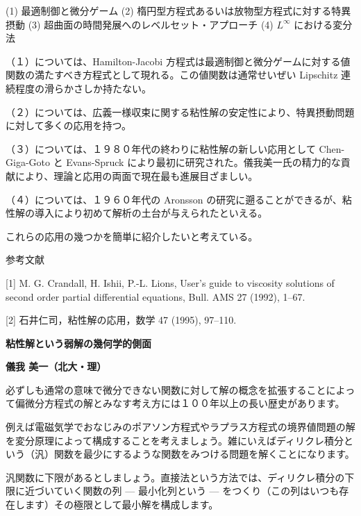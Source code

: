 \documentclass[uplatex,dvipdfmx]{jlreq}
\begin{document}
(1) 最適制御と微分ゲーム  
(2) 楕円型方程式あるいは放物型方程式に対する特異摂動  
(3) 超曲面の時間発展へのレベルセット・アプローチ  
(4) $L^\infty$ における変分法  

（１）については、Hamilton-Jacobi 方程式は最適制御と微分ゲームに対する値関数の満たすべき方程式として現れる。この値関数は通常せいぜい Lipschitz 連続程度の滑らかさしか持たない。

（２）については、広義一様収束に関する粘性解の安定性により、特異摂動問題に対して多くの応用を持つ。

（３）については、１９８０年代の終わりに粘性解の新しい応用として Chen-Giga-Goto と Evans-Spruck により最初に研究された。儀我美一氏の精力的な貢献により、理論と応用の両面で現在最も進展目ざましい。

（４）については、１９６０年代の Aronsson の研究に遡ることができるが、粘性解の導入により初めて解析の土台が与えられたといえる。

これらの応用の幾つかを簡単に紹介したいと考えている。

\bigskip

参考文献

[1] M. G. Crandall, H. Ishii, P.-L. Lions,  
User's guide to viscosity solutions of second order partial differential equations,  
Bull. AMS 27 (1992), 1--67.

[2] 石井仁司，粘性解の応用，数学 47 (1995), 97--110.

\newpage


\begin{center}
{\large\bfseries 粘性解という弱解の幾何学的側面}
\end{center}

\begin{flushright}
\textbf{儀我 美一（北大・理）}
\end{flushright}

必ずしも通常の意味で微分できない関数に対して解の概念を拡張することによって偏微分方程式の解とみなす考え方には１００年以上の長い歴史があります。

例えば電磁気学でおなじみのポアソン方程式やラプラス方程式の境界値問題の解を変分原理によって構成することを考えましょう。雑にいえばディリクレ積分という（汎）関数を最少にするような関数をみつける問題を解くことになります。

汎関数に下限があるとしましょう。直接法という方法では、ディリクレ積分の下限に近づいていく関数の列 --- 最小化列という --- をつくり（この列はいつも存在します）その極限として最小解を構成します。
\end{document}
